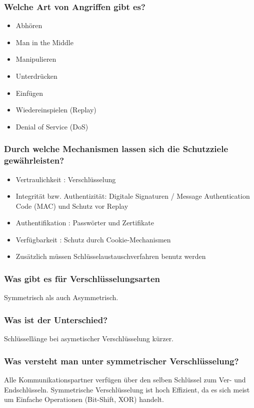 	\subsubsection{Welche Art von Angriffen gibt es?}
		\begin{itemize}
			\item Abhören
			\item Man in the Middle
			\item Manipulieren
			\item Unterdrücken
			\item Einfügen
			\item Wiedereinspielen (Replay)
			\item Denial of Service (DoS)
		\end{itemize}
		
	\subsubsection{Durch welche Mechanismen lassen sich die Schutzziele gewährleisten?}
	\begin{itemize}
		\item Vertraulichkeit : Verschlüsselung
		\item Integrität bzw. Authentizität: Digitale Signaturen / Message Authentication Code (MAC) und Schutz vor Replay
		\item Authentifikation : Passwörter und Zertifikate
		\item Verfügbarkeit : Schutz durch Cookie-Mechanismen
		\item Zusätzlich müssen Schlüsselaustauschverfahren benutz werden
	\end{itemize}
	
		\subsubsection{Was gibt es für Verschlüsselungsarten}
	Symmetrisch als auch Asymmetrisch.
	
		
	\subsubsection{Was ist der Unterschied?}
	Schlüssellänge bei asymetischer Verschlüsselung kürzer.
	
	\subsubsection{Was versteht man unter symmetrischer Verschlüsselung?}
	Alle Kommunikationspartner verfügen über den selben Schlüssel zum Ver- und Endschlüsseln. Symmetrische Verschlüsselung ist hoch Effizient, da es sich meist um Einfache Operationen (Bit-Shift, XOR) handelt.
	
